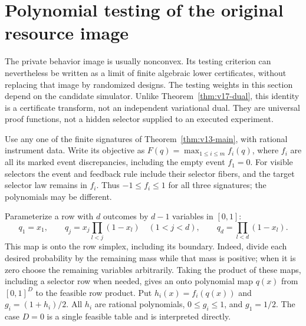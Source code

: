 \section{Polynomial testing of the original resource image}
\label{sec:v16-dual}
The private behavior image is usually nonconvex. Its testing criterion
can nevertheless be written as a limit of finite algebraic lower
certificates, without replacing that image by randomized designs.
The testing weights in this section depend on the candidate simulator.
Unlike Theorem~\ref{thm:v17-dual}, this identity is a certificate
transform, not an independent variational dual.
They are universal proof functions, not a hidden selector supplied to
an executed experiment.

Use any one of the finite signatures of
Theorem~\ref{thm:v13-main}, with rational instrument data. Write its
objective as $F(q)=\max_{1\le i\le m}f_i(q)$, where $f_i$ are all its
marked event discrepancies, including the empty event $f_1=0$.
For visible selectors the event and feedback rule include their selector
fibers, and the target selector law remains in $f_i$. Thus $-1\le f_i\le1$
for all three signatures; the polynomials may be different.

Parameterize a row with $d$ outcomes by $d-1$ variables in $[0,1]$:
\[
 q_1=x_1,\qquad q_j=x_j\prod_{l<j}(1-x_l)\quad(1<j<d),
 \qquad q_d=\prod_{l<d}(1-x_l).
\]
This map is onto the row simplex, including its boundary. Indeed, divide
each desired probability by the remaining mass while that mass is
positive; when it is zero choose the remaining variables arbitrarily.
Taking the product of these maps, including a selector row when needed,
gives an onto polynomial map $q(x)$ from $[0,1]^D$ to the feasible
row product. Put $h_i(x)=f_i(q(x))$ and $g_i=(1+h_i)/2$.
All $h_i$ are rational polynomials, $0\le g_i\le1$, and $g_1=1/2$.
The case $D=0$ is a single feasible table and is interpreted directly.

